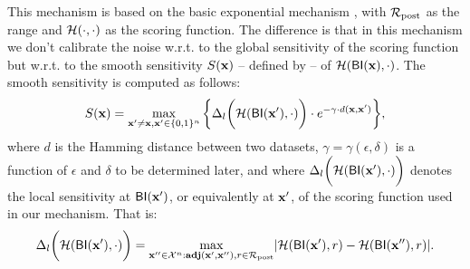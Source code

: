 \documentclass[sigconf]{acmart}
\begin{document}
This mechanism is based on the basic exponential mechanism
\cite{talwar}, with $\mathcal{R}_{\textup{post}}$ as the range and
$\mathcal{H}(\cdot,\cdot)$ as the scoring function. The difference is
that in this mechanism we don't calibrate the noise w.r.t. to the
global sensitivity of the scoring function but w.r.t. to the smooth
sensitivity $S(\textbf{x})$ -- defined by \citet{nissim2007smooth}-- of
$\mathcal{H}(\mathsf{BI}(\textbf{x}), \cdot)$. The smooth sensitivity is
computed as follows:
\begin{equation}
  \label{eq:smooth}
   S(\textbf{x})=\max_{\textbf{x}' \neq \textbf{x}, \textbf{x}' \in \{0,1\}^{n}}\bigg \{\Delta_{l}\bigg (\mathcal{H}(\mathsf{BI}(\textbf{x}'),\cdot)\bigg )\cdot e^{-\gamma\cdot d(\textbf{x}, \textbf{x}')}\bigg\},
\end{equation}
where $d$ is the Hamming distance between two datasets, $\gamma =
\gamma(\epsilon, \delta)$ is a function of $\epsilon$ and $\delta$ to
be determined later, and where $\Delta_{l}\bigg
(\mathcal{H}(\mathsf{BI}(\textbf{x}'),\cdot)\bigg )$ denotes the local
sensitivity at $\mathsf{BI}(\textbf{x}')$, or equivalently at $\textbf{x}'$,
of the scoring function used in our mechanism. That is:
\begin{equation*}
\Delta_{l}\bigg (\mathcal{H}(\mathsf{BI}(\textbf{x}'),\cdot)\bigg )=\max_{\textbf{x}'' \in \mathcal{X}^n:\textbf{adj}(\textbf{x}',\textbf{x}''), r\in \mathcal{R}_{\textup{post}}}\lvert \mathcal{H}(\mathsf{BI}(\textbf{x}'), r) - \mathcal{H}(\mathsf{BI}(\textbf{x}''), r)\rvert.
\end{equation*}
\end{document}
